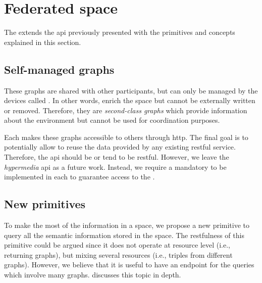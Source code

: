 \section{Federated space}
\label{sec:federated_space}

The \osapi{} extends the \ac{api} previously presented with the primitives and concepts explained in this section.


\subsection{Self-managed graphs}

These graphs are shared with other participants, but can only be managed by the devices called \asteroids{}. %
In other words, \selfgraphs{} enrich the space but cannot be externally written or removed. %
Therefore, they are \emph{second-class graphs} which provide information about the environment but cannot be used for coordination purposes.


Each \asteroid{} makes these graphs accessible to others through \ac{http}.
The final goal is to potentially allow to reuse the data provided by any existing \ac{rest}ful service. %
Therefore, the \ac{api} should be or tend to be \ac{rest}ful.
However, we leave the \emph{hypermedia} \ac{api} as a future work.
Instead, we require a mandatory \osapi{} to be implemented in each \asteroid{} to guarantee access to the \selfgraphs{}.


\subsection{New primitives}

To make the most of the information in a space, we propose a new primitive to query all the semantic information stored in the space.
The \ac{rest}fulness of this primitive could be argued since it does not operate at resource level (i.e., returning graphs), but mixing several resources (i.e., triples from different graphs).
However, we believe that it is useful to have an endpoint for the queries which involve many graphs.
\citet{kjernsmo_necessity_2012} discusses this topic in depth. %

